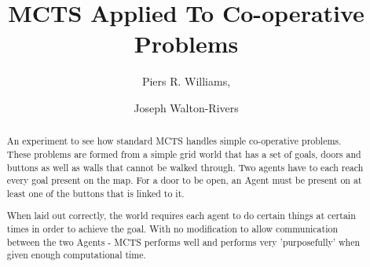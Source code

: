 \documentclass{IEEEtran}
\author{Piers R. Williams, \and Joseph Walton-Rivers}
\title{MCTS Applied To Co-operative Problems}
\begin{document}
\maketitle
\begin{abstract}
An experiment to see how standard MCTS handles simple co-operative problems.	These problems are formed from a simple grid world that has a set of goals, doors and buttons as well as walls that cannot be walked through. Two agents have to each reach every goal present on the map. For a door to be open, an Agent must be present on at least one of the buttons that is linked to it.

When laid out correctly, the world requires each agent to do certain things at certain times in order to achieve the goal. With no modification to allow communication between the two Agents - MCTS performs well and performs very 'purposefully' when given enough computational time.
\end{abstract}
\end{document}
